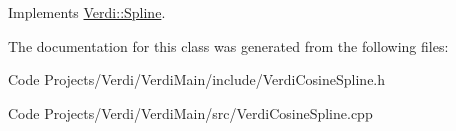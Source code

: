 \-Implements \hyperlink{class_verdi_1_1_spline_aabbae06e6368758e1a689eeacb324f66}{\-Verdi\-::\-Spline}.



\-The documentation for this class was generated from the following files\-:\begin{DoxyCompactItemize}
\item 
\-Code Projects/\-Verdi/\-Verdi\-Main/include/\-Verdi\-Cosine\-Spline.\-h\item 
\-Code Projects/\-Verdi/\-Verdi\-Main/src/\-Verdi\-Cosine\-Spline.\-cpp\end{DoxyCompactItemize}
